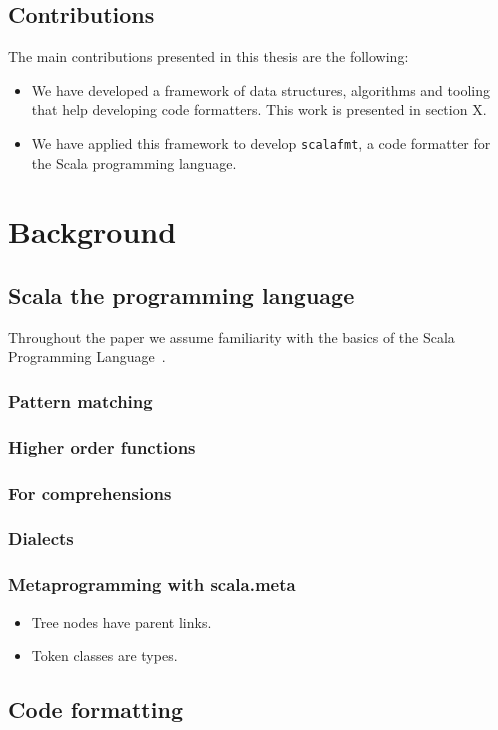 \documentclass[11pt,a4paper]{article}
\newcommand{\scalafmt}{\texttt{scalafmt}}
\begin{document}
\subsection{Contributions}
The main contributions presented in this thesis are the following:
\begin{itemize}
    \item We have developed a framework of data structures, algorithms and tooling that help
      developing code formatters. This work is presented in section X.
    \item We have applied this framework to develop \scalafmt, a code
      formatter for the Scala programming language.
\end{itemize}

\section{Background}
\subsection{Scala the programming language}
Throughout the paper we assume familiarity with the basics of the Scala
Programming Language~\autocite{odersky_scala_2004}.
\subsubsection{Pattern matching}
\subsubsection{Higher order functions}
\subsubsection{For comprehensions}
\subsubsection{Dialects}
\subsubsection{Metaprogramming with scala.meta}
\begin{itemize}
  \item Tree nodes have parent links.
  \item Token classes are types.
\end{itemize}
\subsection{Code formatting}
\end{document}
